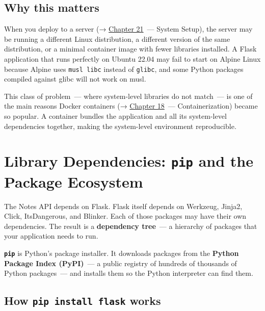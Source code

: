 \subsection*{Why this matters}\label{06-local-dependencies:why-this-matters}

When you deploy to a server (→ \hyperref[ch:21-system-setup]{Chapter 21}~--- System Setup), the server may be running a different Linux distribution, a different version of the same distribution, or a minimal container image with fewer libraries installed. A Flask application that runs perfectly on Ubuntu 22.04 may fail to start on Alpine Linux because Alpine uses \texttt{musl\ libc} instead of \texttt{glibc}, and some Python packages compiled against glibc will not work on musl.

This class of problem~--- where system-level libraries do not match~--- is one of the main reasons Docker containers (→ \hyperref[ch:18-containerization]{Chapter 18}~--- Containerization) became so popular. A container bundles the application and all its system-level dependencies together, making the system-level environment reproducible.

\setcounter{section}{1}
\section{\texorpdfstring{Library Dependencies: \texttt{pip} and the Package Ecosystem}{Library Dependencies: pip and the Package Ecosystem}}\label{06-local-dependencies:62-library-dependencies-pip-and-the-package-ecosystem}

The Notes API depends on Flask. Flask itself depends on Werkzeug, Jinja2, Click, ItsDangerous, and Blinker. Each of those packages may have their own dependencies. The result is a \textbf{dependency tree}~--- a hierarchy of packages that your application needs to run.

\textbf{\texttt{pip}} is Python's package installer. It downloads packages from the \textbf{Python Package Index (PyPI)}~--- a public registry of hundreds of thousands of Python packages~--- and installs them so the Python interpreter can find them.

\subsection*{\texorpdfstring{How \texttt{pip\ install\ flask} works}{How pip install flask works}}\label{06-local-dependencies:how-pip-install-flask-works}

